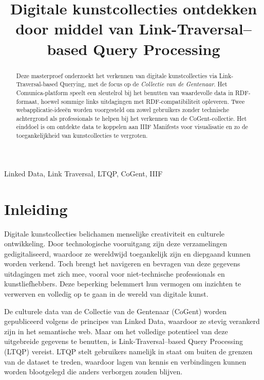 \documentclass[conference]{IEEEtran}
\begin{document}

\title{Digitale kunstcollecties ontdekken door middel van Link-Traversal–based Query Processing}

\author{
}

\maketitle

\begin{abstract}
Deze masterproef onderzoekt het verkennen van digitale kunstcollecties via Link-Traversal-based Querying, met de focus op de \textit{Collectie van de Gentenaar}. Het Comunica-platform speelt een sleutelrol bij het benutten van waardevolle data in RDF-formaat, hoewel sommige links uitdagingen met RDF-compatibiliteit opleveren. Twee webapplicatie-ideeën worden voorgesteld om zowel gebruikers zonder technische achtergrond als professionals te helpen bij het verkennen van de CoGent-collectie. Het einddoel is om ontdekte data te koppelen aan IIIF Manifests voor visualisatie en zo de toegankelijkheid van kunstcollecties te vergroten.
\end{abstract}

\begin{IEEEkeywords}
Linked Data, Link Traversal, LTQP, CoGent, IIIF
\end{IEEEkeywords}

\section*{Inleiding}
Digitale kunstcollecties belichamen menselijke creativiteit en culturele ontwikkeling. Door technologische vooruitgang zijn deze verzamelingen gedigitaliseerd, waardoor ze wereldwijd toegankelijk zijn en diepgaand kunnen worden verkend. Toch brengt het navigeren en bevragen van deze gegevens uitdagingen met zich mee, vooral voor niet-technische professionals en kunstliefhebbers. Deze beperking belemmert hun vermogen om inzichten te verwerven en volledig op te gaan in de wereld van digitale kunst.

De culturele data van de Collectie van de Gentenaar (CoGent) worden gepubliceerd volgens de principes van Linked Data, waardoor ze stevig verankerd zijn in het semantische web. Maar om het volledige potentieel van deze uitgebreide gegevens te benutten, is Link-Traversal–based Query Processing (LTQP) vereist. LTQP stelt gebruikers namelijk in staat om buiten de grenzen van de dataset te treden, waardoor lagen van kennis en verbindingen kunnen worden blootgelegd die anders verborgen zouden blijven.
\end{document}
